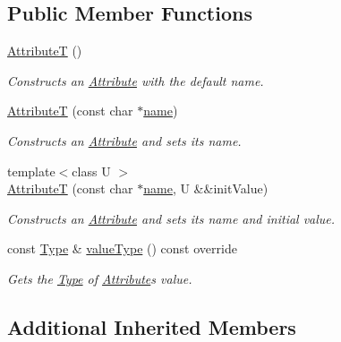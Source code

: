 \subsection*{Public Member Functions}
\begin{DoxyCompactItemize}
\item 
\hyperlink{structdg_1_1deepcore_1_1_attribute_t_a96ecb1397afe18629576293bb00929bc}{AttributeT} ()
\begin{DoxyCompactList}\small\item\em Constructs an \hyperlink{classdg_1_1deepcore_1_1_attribute}{Attribute} with the default name. \end{DoxyCompactList}\item 
\hyperlink{structdg_1_1deepcore_1_1_attribute_t_acf67f891a842b7207965014262b349ec}{AttributeT} (const char $\ast$\hyperlink{classdg_1_1deepcore_1_1_named_object_ab1379a28467dd39a81ceb02cf50dedde}{name})
\begin{DoxyCompactList}\small\item\em Constructs an \hyperlink{classdg_1_1deepcore_1_1_attribute}{Attribute} and sets its name. \end{DoxyCompactList}\item 
{\footnotesize template$<$class U $>$ }\\\hyperlink{structdg_1_1deepcore_1_1_attribute_t_aea9837ba811026a76567ccaca85424b4}{AttributeT} (const char $\ast$\hyperlink{classdg_1_1deepcore_1_1_named_object_ab1379a28467dd39a81ceb02cf50dedde}{name}, U \&\&init\+Value)
\begin{DoxyCompactList}\small\item\em Constructs an \hyperlink{classdg_1_1deepcore_1_1_attribute}{Attribute} and sets its name and initial value. \end{DoxyCompactList}\item 
const \hyperlink{classdg_1_1deepcore_1_1_type}{Type} \& \hyperlink{structdg_1_1deepcore_1_1_attribute_t_a01feaa6ee7327284f7e618152f733ff1}{value\+Type} () const override
\begin{DoxyCompactList}\small\item\em Gets the \hyperlink{classdg_1_1deepcore_1_1_type}{Type} of \hyperlink{classdg_1_1deepcore_1_1_attribute}{Attribute}\textquotesingle{}s value. \end{DoxyCompactList}\end{DoxyCompactItemize}
\subsection*{Additional Inherited Members}



